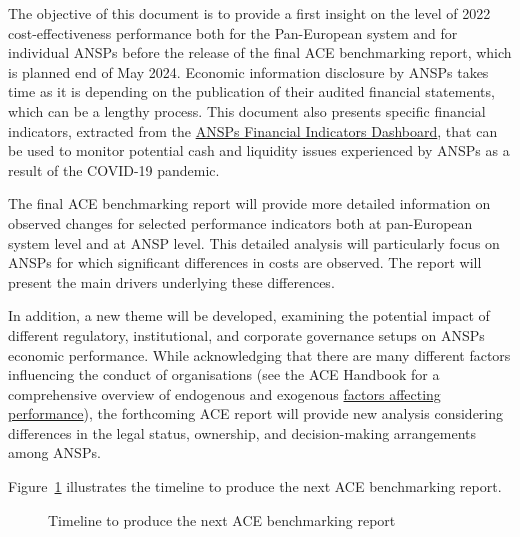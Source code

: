 \documentclass[
  letterpaper,
  DIV=11,
  numbers=noendperiod]{scrreprt}
\begin{document}
The objective of this document is to provide a first insight on the
level of 2022 cost-effectiveness performance both for the Pan-European
system and for individual ANSPs before the release of the final ACE
benchmarking report, which is planned end of May 2024. Economic
information disclosure by ANSPs takes time as it is depending on the
publication of their audited financial statements, which can be a
lengthy process. This document also presents specific financial
indicators, extracted from the
\href{https://ansperformance.eu/economics/finance/}{ANSPs Financial
Indicators Dashboard}, that can be used to monitor potential cash and
liquidity issues experienced by ANSPs as a result of the COVID-19
pandemic.

The final ACE benchmarking report will provide more detailed information
on observed changes for selected performance indicators both at
pan-European system level and at ANSP level. This detailed analysis will
particularly focus on ANSPs for which significant differences in costs
are observed. The report will present the main drivers underlying these
differences.

In addition, a new theme will be developed, examining the potential
impact of different regulatory, institutional, and corporate governance
setups on ANSPs economic performance. While acknowledging that there are
many different factors influencing the conduct of organisations (see the
ACE Handbook for a comprehensive overview of endogenous and exogenous
\href{https://ansperformance.eu/economics/ace/ace-handbook/influencing-factors.html}{factors
affecting performance}), the forthcoming ACE report will provide new
analysis considering differences in the legal status, ownership, and
decision-making arrangements among ANSPs.

Figure~\ref{fig-figure-1-1} illustrates the timeline to produce the next
ACE benchmarking report.

\begin{figure}


\caption{\label{fig-figure-1-1}Timeline to produce the next ACE
benchmarking report}

\end{figure}%
\end{document}
